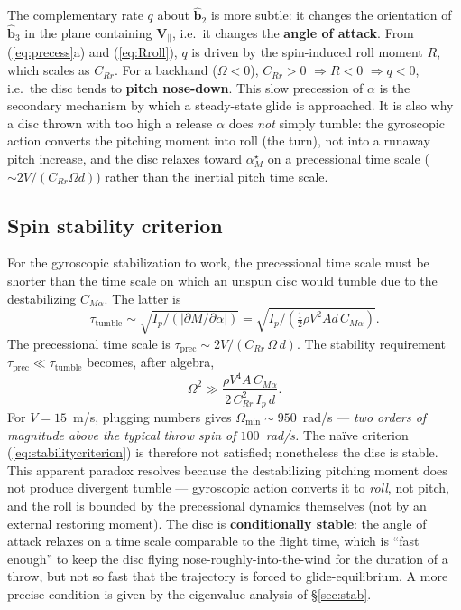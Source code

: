 \documentclass[11pt,letterpaper]{article}
\begin{document}
The complementary rate $q$ about $\hat{\mathbf{b}}_2$ is more subtle: it changes the orientation of $\hat{\mathbf{b}}_3$ in the plane containing $\mathbf{V}_\parallel$, i.e.\ it changes the \textbf{angle of attack}. From (\ref{eq:precess}a) and (\ref{eq:Rroll}), $q$ is driven by the spin-induced roll moment $R$, which scales as $C_{Rr}$. For a backhand ($\Omega < 0$), $C_{Rr} > 0$ $\Rightarrow R < 0$ $\Rightarrow q < 0$, i.e.\ the disc tends to \textbf{pitch nose-down}. This slow precession of $\alpha$ is the secondary mechanism by which a steady-state glide is approached. It is also why a disc thrown with too high a release $\alpha$ does \emph{not} simply tumble: the gyroscopic action converts the pitching moment into roll (the turn), not into a runaway pitch increase, and the disc relaxes toward $\alpha_M^\star$ on a precessional time scale ($\sim 2V/(C_{Rr}\Omega d)$) rather than the inertial pitch time scale.

\subsection{Spin stability criterion}

For the gyroscopic stabilization to work, the precessional time scale must be shorter than the time scale on which an unspun disc would tumble due to the destabilizing $C_{M\alpha}$. The latter is
\begin{equation}
\tau_{\text{tumble}} \sim \sqrt{I_p / (|\partial M / \partial \alpha|)} = \sqrt{I_p / (\tfrac{1}{2}\rho V^2 A d\,C_{M\alpha})}.
\label{eq:tautumble}
\end{equation}
The precessional time scale is $\tau_{\text{prec}} \sim 2V/(C_{Rr}\,\Omega\,d)$. The stability requirement $\tau_{\text{prec}} \ll \tau_{\text{tumble}}$ becomes, after algebra,
\begin{equation}
\Omega^2 \gg \frac{\rho V^4 A\,C_{M\alpha}}{2\,C_{Rr}^2\,I_p\,d}.
\label{eq:stabilitycriterion}
\end{equation}
For $V = 15$~m/s, plugging numbers gives $\Omega_{\min} \sim 950$~rad/s --- \emph{two orders of magnitude above the typical throw spin of $100$~rad/s.} The naïve criterion (\ref{eq:stabilitycriterion}) is therefore not satisfied; nonetheless the disc is stable. This apparent paradox resolves because the destabilizing pitching moment does not produce divergent tumble --- gyroscopic action converts it to \emph{roll}, not pitch, and the roll is bounded by the precessional dynamics themselves (not by an external restoring moment). The disc is \textbf{conditionally stable}: the angle of attack relaxes on a time scale comparable to the flight time, which is ``fast enough'' to keep the disc flying nose-roughly-into-the-wind for the duration of a throw, but not so fast that the trajectory is forced to glide-equilibrium. A more precise condition is given by the eigenvalue analysis of \S\ref{sec:stab}.
\end{document}
